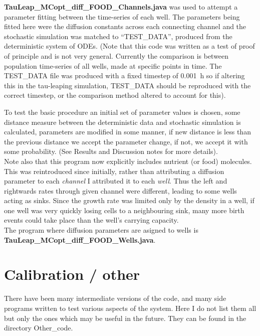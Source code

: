 \documentclass[a4paper,10pt]{article}
\begin{document}
{\bf TauLeap\_MCopt\_diff\_FOOD\_Channels.java} was used to attempt a parameter fitting between the time-series of each well. 
The parameters being fitted here were the diffusion constants across each connecting channel and the stochastic simulation was matched to
``TEST\_DATA'', produced from the deterministic system of ODEs. (Note that this code was written as a test of proof of principle and is not very general. 
Currently the comparison is between population time-series of all wells, made at specific points in time. The TEST\_DATA file was produced with a 
fixed timestep of 0.001~h so if altering this in the tau-leaping simulation, TEST\_DATA should be reproduced with the correct timestep, or the comparison
method altered to account for this).

To test the basic procedure an initial set of parameter values is chosen, some distance measure between the deterministic data and stochastic simulation
is calculated, parameters are modified in some manner, if new distance is less than the previous distance we accept the parameter change, if not, we
accept it with some probability. (See Results and Discussion notes for more details).\\

Note also that this program now explicitly includes nutrient (or food) molecules. This was reintroduced since initially, rather than attributing a diffusion
parameter to each \emph{channel} I attributed it to each \emph{well}. Thus the left and rightwards rates through given channel were different, leading to some wells
acting as sinks. Since the growth rate was limited only by the density in a well, if one well was very quickly losing cells to a neighbouring sink, many more birth events
could take place than the well's carrying capacity.\\

The program where diffusion parameters are asigned to wells is {\bf TauLeap\_MCopt\_diff\_FOOD\_Wells.java}.\\


 

 
 
 
 
 
 



 
 \clearpage
 \newpage
 
\section{Calibration / other}
There have been many intermediate versions of the code, and many side programs written to test various aspects of the system. Here I do not list them all but
only the ones which may be useful in the future. They can be found in the directory Other\_code.
 
\end{document}
